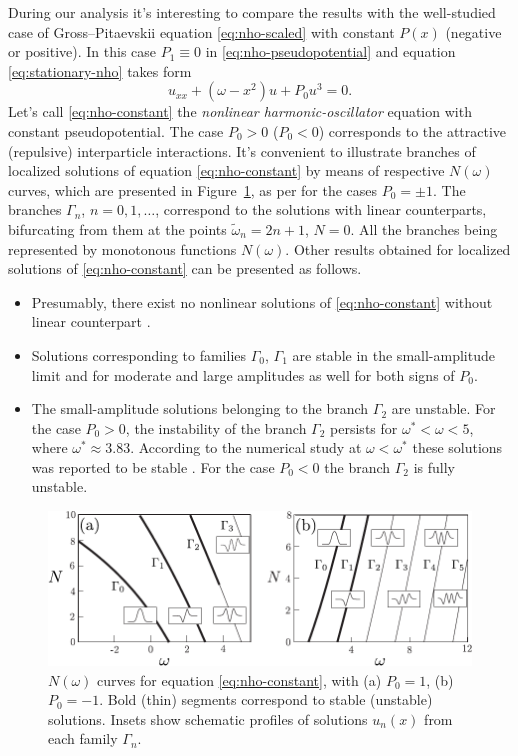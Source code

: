 During our analysis it's interesting to compare the results with the well-studied case of Gross--Pitaevskii equation \eqref{eq:nho-scaled} with constant $P(x)$ (negative or positive).
In this case $P_1 \equiv 0$ in \eqref{eq:nho-pseudopotential} and equation \eqref{eq:stationary-nho} takes form
\begin{equation}
	u_{xx} + (\omega - x^2) u + P_0 u^3 = 0.
\label{eq:nho-constant}
\end{equation}
Let's call \eqref{eq:nho-constant} the {\it nonlinear harmonic-oscillator} equation with constant pseudopotential.
The case $P_0 > 0$ ($P_0 < 0$) corresponds to the attractive (repulsive) interparticle interactions.
It's convenient to illustrate branches of localized solutions of equation \eqref{eq:nho-constant} by means of respective $N(\omega)$ curves, which are presented in Figure~\ref{fig:branches-constant-nho}, as per \cite{ZezyulinAlfimovKonotopPerecGarcia2007, ZezyulinAlfimovKonotopPerecGarcia2008} for the cases $P_0 = \pm 1$.
The branches $\Gamma_n$, $n = 0, 1, \dots$, correspond to the solutions with linear counterparts, bifurcating from them at the points $\tilde{\omega}_n = 2n + 1$, $N = 0$.
All the branches being represented by monotonous functions $N(\omega)$.
Other results obtained for localized solutions of \eqref{eq:nho-constant} can be presented as follows.
\begin{itemize}
	\item Presumably, there exist no nonlinear solutions of \eqref{eq:nho-constant} without linear counterpart \cite{AlfimovZezyulin}.
	\item Solutions corresponding to families $\Gamma_0$, $\Gamma_1$ are stable in the small-amplitude limit and for moderate and large amplitudes as well for both signs of $P_0$.
	\item
		The small-amplitude solutions belonging to the branch $\Gamma_2$ are unstable.
		For the case $P_0 > 0$, the instability of the branch $\Gamma_2$ persists for $\omega^* < \omega < 5$, where $\omega^* \approx 3.83$.
		According to the numerical study at $\omega < \omega^*$ these solutions was reported to be stable \cite{AlfimovZezyulin}.
		For the case $P_0 < 0$ the branch $\Gamma_2$ is fully unstable. 
\end{itemize}

\begin{figure}[h]
\centering
	\includegraphics[scale = 1]{pic/stability for nho with constant pseudopotential}
	\caption{
		$N(\omega)$ curves for equation \eqref{eq:nho-constant}, with (a) $P_0 = 1$, (b) $P_0 = -1$.
		Bold (thin) segments correspond to stable (unstable) solutions.
		Insets show schematic profiles of solutions $u_n(x)$ from each family $\Gamma_n$.
	}
\label{fig:branches-constant-nho}
\end{figure}

